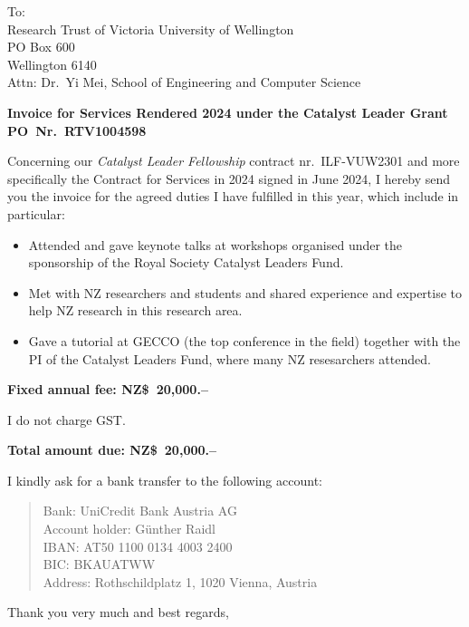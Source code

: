 \documentclass[12pt,a4paper]{letter}
\begin{document}
\begin{letter}{To:\\
    Research Trust of Victoria University of Wellington\\
    PO Box 600\\
    Wellington 6140\\
    Attn: Dr.~Yi Mei, School of Engineering and Computer Science}
\opening{\textbf{Invoice for Services Rendered 2024 under the Catalyst Leader Grant\\
PO~Nr.~RTV1004598}}
\bigskip

Concerning our \emph{Catalyst Leader Fellowship} contract \mbox{nr.~ILF-VUW2301} and more specifically the Contract for Services in 2024 signed in June 2024, I hereby send you the invoice for the agreed duties I have fulfilled in this year, which include in particular:
\begin{itemize}
    \item Attended and gave keynote talks at workshops organised under the sponsorship of
    the Royal Society Catalyst Leaders Fund.
    \item Met with NZ researchers and students and shared experience and expertise to
    help NZ research in this research area.
    \item Gave a tutorial at GECCO (the top conference in the field) together with the PI of
    the Catalyst Leaders Fund, where many NZ resesarchers attended.
\end{itemize}
\bigskip

\textbf{Fixed annual fee: NZ\$~20,000.--}

I do not charge GST.

\textbf{Total amount due: NZ\$~20,000.--}

\bigskip

I kindly ask for a bank transfer to the following account:

\begin{quote}
    Bank: UniCredit Bank Austria AG\\
    Account holder: Günther Raidl\\
    IBAN: AT50 1100 0134 4003 2400\\
    BIC: BKAUATWW\\
    Address: Rothschildplatz 1, 1020 Vienna, Austria
\end{quote}

\bigskip
\closing{Thank you very much and best regards,}
\vspace{1cm}

\end{letter}
\end{document}
